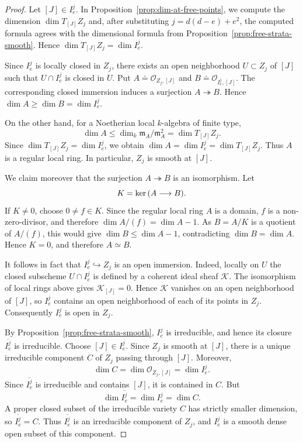 \documentclass[11pt]{amsart} %
\newcommand{\lar}{\longrightarrow}
\theoremstyle{definition}
\def\ker{{\rm ker}\,}
\begin{document}
\begin{proof}
Let $[J]\in I_e^j$. In Proposition~\ref{prop:dim-at-free-points}, we compute the dimension \(\dim T_{[J]}Z_j\) and, after substituting $j = d(d-e)+e^2$, the computed formula agrees with the dimensional formula from Proposition~\ref{prop:free-strata-smooth}. Hence \(\dim T_{[J]}Z_j = \dim I_e^j\).

Since $I_e^j$ is locally closed in $Z_j$, there exists an open
neighborhood $U\subset Z_j$ of $[J]$ such that
$U\cap I_e^j$ is closed in $U$. Put $A\doteq \mathcal O_{Z_j,[J]}$ and 
$B\doteq \mathcal O_{I_e^j,[J]}$. The corresponding closed immersion induces a surjection \(A\twoheadrightarrow B\). Hence \(\dim A\geq \dim B=\dim I_e^j\).

On the other hand, for a Noetherian local $k$-algebra of finite type,
\[ 
\dim A \leq \dim_k\mathfrak m_A/\mathfrak m_A^2
=
\dim T_{[J]}Z_j.
\]
Since \(\dim T_{[J]}Z_j=\dim I_e^j\), we obtain
\( \dim A = \dim I_e^j = \dim T_{[J]}Z_j.
\)
Thus $A$ is a regular local ring. In particular, $Z_j$ is smooth at
$[J]$.

We claim moreover that the surjection $A\twoheadrightarrow B$ is an
isomorphism. Let
\[
K=\ker(A\lar B).
\]
If $K\neq0$, choose $0\neq f\in K$. Since the regular local ring $A$
is a domain, $f$ is a non-zero-divisor, and therefore \(\dim A/(f)=\dim A-1\). As $B=A/K$ is a quotient of $A/(f)$, this would give
\(\dim B\leq \dim A-1\), contradicting $\dim B=\dim A$. Hence $K=0$, and therefore \(A\simeq B\).

It follows in fact that \(I_e^j\hookrightarrow Z_j\) is an open immersion. Indeed, locally on $U$ the closed subscheme
$U\cap I_e^j$ is defined by a coherent ideal sheaf $\mathcal K$.
The isomorphism of local rings above gives \(\mathcal K_{[J]}=0\). Hence $\mathcal K$ vanishes on an open neighborhood of $[J]$, so
$I_e^j$ contains an open neighborhood of each of its points in
$Z_j$. Consequently $I_e^j$ is open in $Z_j$.

By Proposition~\ref{prop:free-strata-smooth}, $I_e^j$ is
irreducible, and hence its closure \(\overline{I_e^j}\) is irreducible. Choose $[J]\in I_e^j$. Since $Z_j$ is smooth at
$[J]$, there is a unique irreducible component $C$ of $Z_j$ passing
through $[J]$. Moreover,
\[
\dim C
=
\dim\mathcal O_{Z_j,[J]}
=
\dim I_e^j.
\]
Since $\overline{I_e^j}$ is irreducible and contains $[J]$, it is
contained in $C$. But
\[
\dim\overline{I_e^j}
=
\dim I_e^j
=
\dim C.
\]
A proper closed subset of the irreducible variety $C$ has strictly
smaller dimension, so \(\overline{I_e^j}=C\). Thus $\overline{I_e^j}$ is an irreducible component of $Z_j$, and
$I_e^j$ is a smooth dense open subset of this component.
\end{proof}
\end{document}
